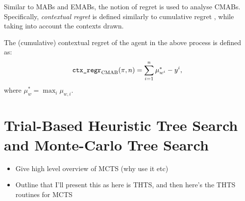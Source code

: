         Similar to MABs and EMABs, the notion of regret is used to analyse CMABs. Specifically, \textit{contextual regret} is defined similarly to cumulative regret , while taking into account the contexts drawn.

        \begin{defn}
            The \textnormal{(cumulative) contextual regret} of the agent in the above process is defined as:
            \begin{align}
                {\textnormal{\texttt{ctx\_regr}}}_{{\textnormal{CMAB}}}(\pi,n) = \sum_{i=1}^n \mu_{w^i}^* - y^i,
            \end{align}
            where $\mu_{w}^* = \max_i \mu_{w,i}$.
        \end{defn}






















\section{Trial-Based Heuristic Tree Search and Monte-Carlo Tree Search}
\label{sec:2-3-thts}

    \begin{itemize}
        \item Give high level overview of MCTS (why use it etc)
        \item Outline that I'll present this as here is THTS, and then here's the THTS routines for MCTS
    \end{itemize}

